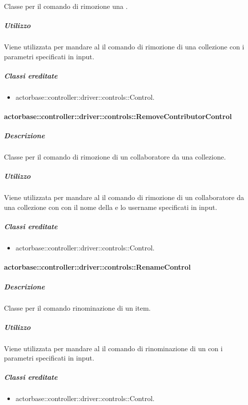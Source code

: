 \documentclass{scalatekids-article}
\begin{document}
Classe per il comando di rimozione una .

\subparagraph{Utilizzo}

Viene utilizzata per mandare al  il comando di rimozione di una
collezione con i parametri specificati in input.

\subparagraph{Classi ereditate}

\begin{itemize}
\item actorbase::controller::driver::controls::Control.
\end{itemize}

\paragraph{actorbase::controller::driver::controls::RemoveContributorControl}

\subparagraph{Descrizione}

Classe per il comando di rimozione di un collaboratore da una collezione.

\subparagraph{Utilizzo}

Viene utilizzata per mandare al  il comando di rimozione di un
collaboratore da una collezione con con il nome della  e lo
username specificati in input.

\subparagraph{Classi ereditate}

\begin{itemize}
\item actorbase::controller::driver::controls::Control.
\end{itemize}

\paragraph{actorbase::controller::driver::controls::RenameControl}

\subparagraph{Descrizione}

Classe per il comando rinominazione di un item.

\subparagraph{Utilizzo}

Viene utilizzata per mandare al  il comando di rinominazione di
un  con i parametri specificati in input.

\subparagraph{Classi ereditate}

\begin{itemize}
\item actorbase::controller::driver::controls::Control.
\end{itemize}
\end{document}
